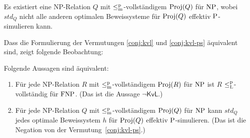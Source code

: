 \begin{conjecture}\label{conj:kvl-ps}
    Es existiert eine NP-Relation $Q$ mit $\leqmp$-vollständigem $\Proj(Q)$ für $\NP$, wobei $\mathit{std}_Q$ nicht alle anderen optimalen Beweissysteme für $\Proj(Q)$ effektiv $\P$-simulieren kann.


\end{conjecture}
Dass die Formulierung der Vermutungen \ref{conj:kvl} und \ref{conj:kvl-ps} äquivalent sind, zeigt folgende Beobachtung:
\begin{observation}\label{obs:kvl-equiv}
    Folgende Aussagen sind äquivalent:
    \begin{enumerate}
        \item Für jede NP-Relation $R$ mit $\leqmp$-vollständigem $\Proj(R)$ für $\NP$ ist $R$ $\leqlp$-vollständig für $\FNP$. (Das ist die Aussage $\neg\mathsf{KvL}$.)
        \item Für jede NP-Relation $Q$ mit $\leqmp$-vollständigem $\Proj(Q)$ für $\NP$ kann $\mathit{std}_Q$ jedes optimale Beweissystem $h$ für $\Proj(Q)$ effektiv $\P$-simulieren. (Das ist die Negation von der Vermutung~\ref{conj:kvl-ps}.)
    \end{enumerate}
\end{observation}
